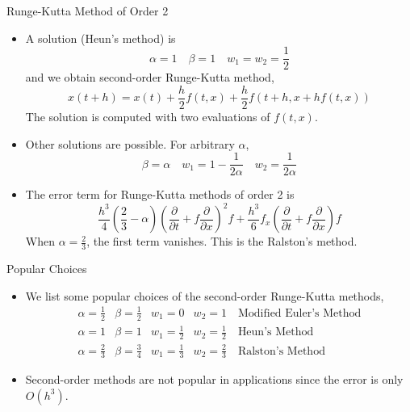 \documentclass{beamer}
\newcommand{\beforeverb}{\footnotesize}
\newcommand{\afterverb}{\normalsize}
\begin{document}
\begin{frame}{Runge-Kutta Method of Order 2}
\begin{itemize}
\item A solution (\alert{Heun's method}) is 
\beforeverb
\[
\alpha=1\quad \beta=1 \quad w_1=w_2=\frac{1}{2}
\]
\afterverb
and we obtain \alert{second-order Runge-Kutta method},
\[
x(t+h)=x(t)+\frac{h}{2}f(t,x)+\frac{h}{2}f(t+h,x+hf(t,x))
\]
The solution  is computed with \alert{two evaluations} of $f(t,x)$.
\item Other solutions are possible. For arbitrary $\alpha$, 
\beforeverb
\[
\beta=\alpha \quad w_1 =1-\frac{1}{2\alpha} \quad w_2 =\frac{1}{2\alpha}
\]
\afterverb
\item The error term for Runge-Kutta methods of order 2 is 
\beforeverb
\[
\frac{h^3}{4}\left(\frac{2}{3}-\alpha \right) \left(\frac{\partial }{\partial t}+f\frac{\partial }{\partial x}\right)^2 f+\frac{h^3}{6}f_x  \left(\frac{\partial }{\partial t}+f\frac{\partial }{\partial x}\right) f
\]
\afterverb
When $\alpha =\frac{2}{3}$, the first term vanishes. This is the \alert{Ralston's method}. 
\end{itemize}
\end{frame}
\begin{frame}{Popular Choices}

\begin{itemize}
\item We list some popular choices of the second-order Runge-Kutta methods,
\begin{align*}
\alpha=\frac{1}{2} &\beta=\frac{1}{2} &w_1=0 &w_2=1 \quad\mbox{Modified Euler's Method}\\
\alpha=1 &\beta=1 &w_1=\frac{1}{2} &w_2=\frac{1}{2} \quad\mbox{Heun's Method}\\
\alpha=\frac{2}{3} &\beta=\frac{3}{4} &w_1=\frac{1}{3} &w_2=\frac{2}{3} \quad\mbox{Ralston's Method}
\end{align*}
\item Second-order methods are not popular in applications since the error is only $O(h^3)$.
\end{itemize}
\end{frame}
\end{document}
